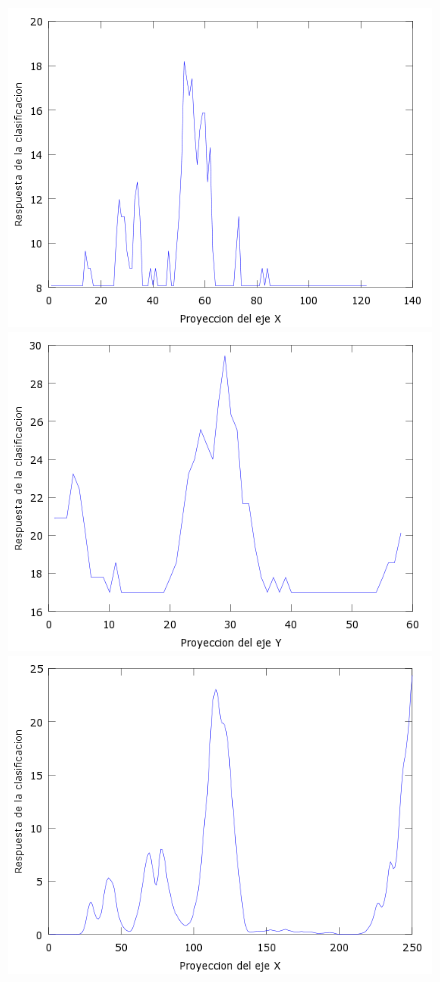 \begin{figure}[H]
  \centering
  \includegraphics[scale=.4]{images/plots/boost2X}
  \includegraphics[scale=.4]{images/plots/boost2Y}
  \includegraphics[scale=.4]{images/plots/svm2X}

\end{figure}

